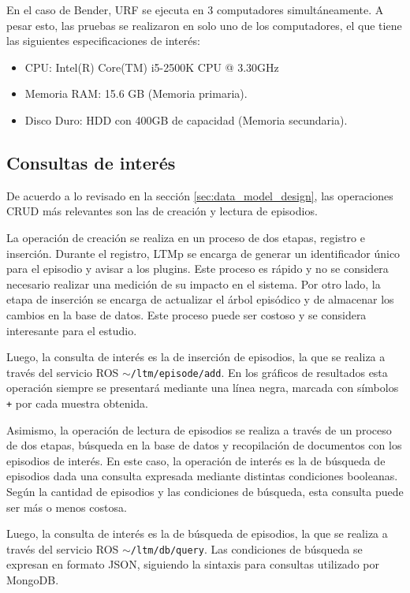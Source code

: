  En el caso de Bender, URF se ejecuta en 3 computadores simultáneamente. A pesar esto, las pruebas se realizaron en solo uno de los computadores, el que tiene las siguientes especificaciones de interés:
\begin{itemize}
\item CPU: Intel(R) Core(TM) i5-2500K CPU @ 3.30GHz
\item Memoria RAM: 15.6 GB (Memoria primaria).
\item Disco Duro: HDD con 400GB de capacidad (Memoria secundaria).
\end{itemize}


\subsection{Consultas de interés}

De acuerdo a lo revisado en la sección \ref{sec:data_model_design}, las operaciones CRUD más relevantes son las de creación y lectura de episodios.

La operación de creación se realiza en un proceso de dos etapas, registro e inserción. Durante el registro, LTMp se encarga de generar un identificador único para el episodio y avisar a los plugins. Este proceso es rápido y no se considera necesario realizar una medición de su impacto en el sistema. Por otro lado, la etapa de inserción se encarga de actualizar el árbol episódico y de almacenar los cambios en la base de datos. Este proceso puede ser costoso y se considera interesante para el estudio.

Luego, la consulta de interés es la de inserción de episodios, la que se realiza a través del servicio ROS \texttt{$\sim$/ltm/episode/add}. En los gráficos de resultados esta operación siempre se presentará mediante una línea negra, marcada con símbolos \texttt{+} por cada muestra obtenida.

Asimismo, la operación de lectura de episodios se realiza a través de un proceso de dos etapas, búsqueda en la base de datos y recopilación de documentos con los episodios de interés. En este caso, la operación de interés es la de búsqueda de episodios dada una consulta expresada mediante distintas condiciones booleanas. Según la cantidad de episodios y las condiciones de búsqueda, esta consulta puede ser más o menos costosa.

Luego, la consulta de interés es la de búsqueda de episodios, la que se realiza a través del servicio ROS \texttt{$\sim$/ltm/db/query}. Las condiciones de búsqueda se expresan en formato JSON, siguiendo la sintaxis para consultas utilizado por MongoDB.

